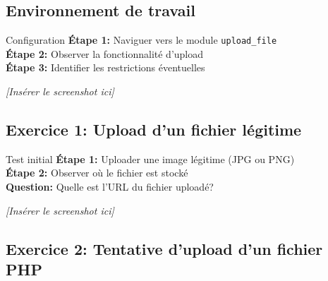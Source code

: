 \documentclass[12pt,a4paper]{article}
\begin{document}
\subsection{Environnement de travail}

\begin{exercicebox}{Configuration}
\textbf{Étape 1:} Naviguer vers le module \texttt{upload\_file}\\
\textbf{Étape 2:} Observer la fonctionnalité d'upload\\
\textbf{Étape 3:} Identifier les restrictions éventuelles
\end{exercicebox}

\begin{answerbox}
\vspace{7cm}
\end{answerbox}

\begin{screenshotbox}
\centering
\textit{[Insérer le screenshot ici]}
\end{screenshotbox}

\subsection{Exercice 1: Upload d'un fichier légitime}

\begin{exercicebox}{Test initial}
\textbf{Étape 1:} Uploader une image légitime (JPG ou PNG)\\
\textbf{Étape 2:} Observer où le fichier est stocké\\
\textbf{Question:} Quelle est l'URL du fichier uploadé?
\end{exercicebox}

\begin{answerbox}
\vspace{7cm}
\end{answerbox}

\begin{screenshotbox}
\centering
\textit{[Insérer le screenshot ici]}
\end{screenshotbox}

\subsection{Exercice 2: Tentative d'upload d'un fichier PHP}
\end{document}
